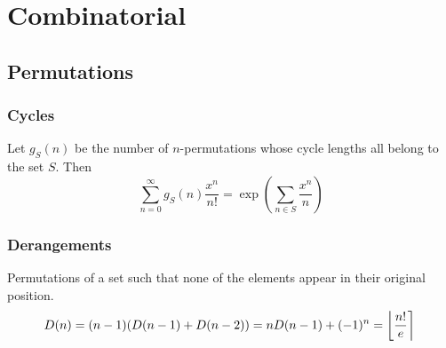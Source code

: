 \chapter{Combinatorial}  
\section{Permutations}
  \subsection{Cycles}
  Let $g_S(n)$ be the number of $n$-permutations whose cycle lengths all belong to the set $S$. Then
  $$\sum_{n=0} ^\infty g_S(n) \frac{x^n}{n!} = \exp\left(\sum_{n\in S} \frac{x^n} {n} \right)$$  
  \subsection{Derangements}
  Permutations of a set such that none of the elements appear in their original position.
  \[ \mkern-2mu D(n) = (n-1)(D(n-1)+D(n-2)) = n D(n-1)+(-1)^n = \left\lfloor\frac{n!}{e}\right\rceil \]  
